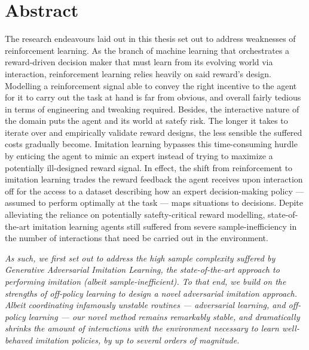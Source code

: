 

\thispagestyle{empty}
\chapter*{Abstract}

The research endeavours laid out in this thesis set out to
address weaknesses of reinforcement learning.
As the branch of machine learning that orchestrates a
reward-driven decision maker that must learn from its evolving world
via interaction, reinforcement learning relies heavily on said reward's design.
Modelling a reinforcement signal able to convey the right incentive to the agent
for it to carry out the task at hand is far from obvious, and overall fairly tedious
in terms of engineering and tweaking required.
Besides, the interactive nature of the domain puts the agent and its world at satefy risk.
The longer it takes to iterate over and empirically validate reward designs,
the less sensible the suffered costs gradually become.
Imitation learning bypasses this time-consuming hurdle by enticing the agent to mimic an expert
instead of trying to maximize a potentially ill-designed reward signal.
In effect, the shift from reinforcement to imitation learning trades the reward feedback the
agent receives upon interaction off for the access to
a dataset describing how an expert decision-making policy
--- assumed to perform optimally at the task --- maps situations to decisions.
Depite alleviating the reliance on potentially satefty-critical reward modelling,
state-of-the-art imitation learning agents still suffered from severe sample-inefficiency in the
number of interactions that need be carried out in the environment.

\emph{%
As such, we first set out to address the high sample complexity
suffered by Generative Adversarial Imitation Learning, the state-of-the-art approach
to performing imitation (albeit sample-inefficient).
To that end, we build on the strengths of off-policy learning
to design a novel adversarial imitation approach.
Albeit coordinating infamously unstable routines --- adversarial learning, and off-policy learning ---
our novel method remains remarkably stable, and dramatically shrinks the amount of interactions with the
environment necessary to learn well-behaved imitation policies,
by up to several orders of magnitude.
}

